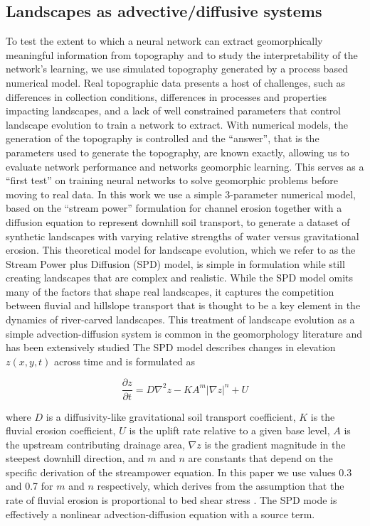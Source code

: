 \documentclass[draft]{agujournal2019}
\begin{document}
\subsection{Landscapes as advective/diffusive systems}
\label{sec:org194ef59}
To test the extent to which a neural network can extract geomorphically meaningful information from topography and to study the interpretability of the network's learning, we use simulated topography generated by a process based numerical model.  Real topographic data presents a host of challenges, such as differences in collection conditions, differences in processes and properties impacting landscapes, and a lack of well constrained parameters that control landscape evolution to train a network to extract.
With numerical models, the generation of the topography is controlled and the ``answer'', that is the parameters used to generate the topography, are known exactly, allowing us to evaluate network performance and networks geomorphic learning.  This serves as a ``first test'' on training neural networks to solve geomorphic problems before moving to real data.  In this work we use a simple 3-parameter numerical model, based on the ``stream power'' formulation for channel erosion together with a diffusion equation to represent downhill soil transport, to generate a dataset of synthetic landscapes with varying relative strengths of water versus gravitational erosion.
This theoretical model for landscape evolution, which we refer to as the Stream Power plus Diffusion (SPD) model, is simple in formulation while still creating landscapes that are complex and realistic.  While the SPD model omits many of the factors that shape real landscapes, it captures the competition between fluvial and hillslope transport that is thought to be a key element in the dynamics of river-carved landscapes.
This treatment of landscape evolution as a simple advection-diffusion system is common in the geomorphology literature and has been extensively studied \cite{howardModelingFluvialErosion1994, whippleDynamicsStreampowerRiver1999, tuckerTopographicOutcomesPredicted2002, tuckerModellingLandscapeEvolution2010, perronControlsSpacingFirstorder2008, theodoratosScalingSimilarityStreampower2018} 
The SPD model describes changes in elevation \(z(x,y,t)\) across time and is formulated as
\begin{linenomath*}
  \[\frac{\partial z}{\partial t}= D\nabla^2 z - KA^m|\nabla z|^n +U\]
\end{linenomath*}
where \(D\) is a diffusivity-like gravitational soil transport coefficient, \(K\) is the fluvial erosion coefficient, \(U\) is the uplift rate relative to a given base level, \(A\) is the upstream contributing drainage area, \(\nabla z\) is the gradient magnitude in the steepest downhill direction, and \(m\) and \(n\) are constants that depend on the specific derivation of the streampower equation.  In this paper we use values 0.3 and 0.7 for \(m\) and \(n\) respectively, which derives from the assumption that the rate of fluvial erosion is proportional to bed shear stress \cite{howardModelingFluvialErosion1994}.  The SPD mode is effectively a nonlinear advection-diffusion equation with a source term.
\end{document}
